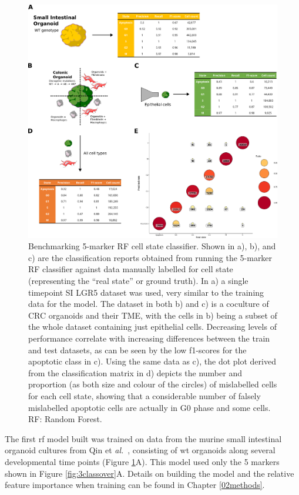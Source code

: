 \begin{figure}
    \centering
    \includegraphics{03cytof/figs/3CLASS_5m.png}
    \caption{Benchmarking 5-marker RF cell state classifier. Shown in a), b), and c) are the classification reports obtained from running the 5-marker RF classifier against data manually labelled for cell state (representing the “real state” or ground truth). In a) a single timepoint SI LGR5 dataset was used, very similar to the training data for the model. The dataset in both b) and c) is a coculture of CRC organoids and their TME, with the cells in b) being a subset of the whole dataset containing just epithelial cells. Decreasing levels of performance correlate with increasing differences between the train and test datasets, as can be seen by the low f1-scores for the apoptotic class in c). Using the same data as c), the dot plot derived from the classification matrix in d) depicts the number and proportion (as both size and colour of the circles) of mislabelled cells for each cell state, showing that a considerable number of falsely mislabelled apoptotic cells are actually in G0 phase and some cells. RF: Random Forest.}
    \label{fig:3class5m}
\end{figure}

The first \acrshort{rf} model built was trained on data from the murine small intestinal organoid cultures from Qin et \emph{al.}~\cite{qin_cell-type-specific_2020}, consisting of \acrshort{wt} organoids along several developmental time points (Figure \ref{fig:3class5m}A). This model used only the 5 markers shown in Figure \ref{fig:3classover}A. Details on building the model and the relative feature importance when training can be found in Chapter \ref{02methods}.

